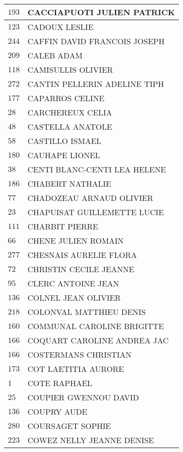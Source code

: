 \begin{xltabular}{\linewidth}{|l|X|}
    \hline
    $193$ & CACCIAPUOTI JULIEN PATRICK \\
    \hline
    $123$ & CADOUX LESLIE \\
    \hline
    $244$ & CAFFIN DAVID FRANCOIS JOSEPH \\
    \hline
    $209$ & CALEB ADAM \\
    \hline
    $118$ & CAMISULLIS OLIVIER \\
    \hline
    $272$ & CANTIN PELLERIN ADELINE TIPH \\
    \hline
    $177$ & CAPARROS CELINE \\
    \hline
    $28$ & CARCHEREUX CELIA \\
    \hline
    $48$ & CASTELLA ANATOLE \\
    \hline
    $58$ & CASTILLO ISMAEL \\
    \hline
    $180$ & CAUHAPE LIONEL \\
    \hline
    $38$ & CENTI BLANC-CENTI LEA HELENE \\
    \hline
    $186$ & CHABERT NATHALIE \\
    \hline
    $77$ & CHADOZEAU ARNAUD OLIVIER \\
    \hline
    $23$ & CHAPUISAT GUILLEMETTE LUCIE \\
    \hline
    $111$ & CHARBIT PIERRE \\
    \hline
    $66$ & CHENE JULIEN ROMAIN \\
    \hline
    $277$ & CHESNAIS AURELIE FLORA \\
    \hline
    $72$ & CHRISTIN CECILE JEANNE \\
    \hline
    $95$ & CLERC ANTOINE JEAN \\
    \hline
    $136$ & COLNEL JEAN OLIVIER \\
    \hline
    $218$ & COLONVAL MATTHIEU DENIS \\
    \hline
    $160$ & COMMUNAL CAROLINE BRIGITTE \\
    \hline
    $166$ & COQUART CAROLINE ANDREA JAC \\
    \hline
    $166$ & COSTERMANS CHRISTIAN \\
    \hline
    $173$ & COT LAETITIA AURORE \\
    \hline
    $1$ & COTE RAPHAEL \\
    \hline
    $25$ & COUPIER GWENNOU DAVID \\
    \hline
    $136$ & COUPRY AUDE \\
    \hline
    $280$ & COURSAGET SOPHIE \\
    \hline
    $223$ & COWEZ NELLY JEANNE DENISE \\

\end{xltabular}
